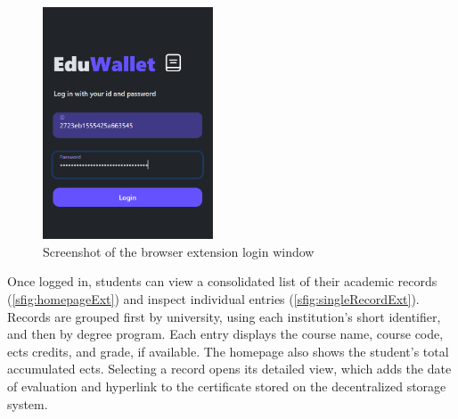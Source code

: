 \begin{figure}
  \centering
  \includegraphics[width=0.45\textwidth]{figures/Login.png}
  \caption[Browser extension login page]{Screenshot of the browser extension login window}
  \label{fig:loginExtDesign}
\end{figure}

Once logged in, students can view a consolidated list of their academic records (\cref{sfig:homepageExt}) and inspect individual entries (\cref{sfig:singleRecordExt}). Records are grouped first by university, using each institution's short identifier, and then by degree program. Each entry displays the course name, course code, \gls{ects} credits, and grade, if available. The homepage also shows the student's total accumulated \gls{ects}. Selecting a record opens its detailed view, which adds the date of evaluation and hyperlink to the certificate stored on the decentralized storage system. 

